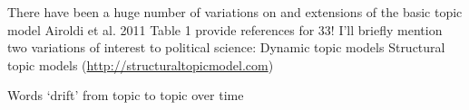 \documentclass{mediumfoils}
\begin{document}
%

%
%
%
%
%
%
%
%
%
%
%
%
%
%
%
%
%






There have been a huge number of variations on and extensions of the basic topic model 
\ita
\itm Airoldi et al. 2011 Table 1 provide references for 33!
\itz
I'll briefly mention two variations of interest to political science:
\ita
\itm Dynamic topic models
\itm Structural topic models (\url{http://structuraltopicmodel.com})
\itz


Words `drift' from topic to topic over time
\end{document}
